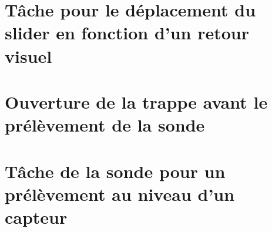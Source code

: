 \documentclass[letterpaper,10pt,english]{sphinxmanual}
\begin{document}
\sphinxstepscope


\chapter{Tâche pour le déplacement du slider en fonction d’un retour visuel}
\label{\detokenize{slider:tache-pour-le-deplacement-du-slider-en-fonction-d-un-retour-visuel}}\label{\detokenize{slider::doc}}


































\sphinxstepscope


\chapter{Ouverture de la trappe avant le prélèvement de la sonde}
\label{\detokenize{trappe:ouverture-de-la-trappe-avant-le-prelevement-de-la-sonde}}\label{\detokenize{trappe::doc}}
\sphinxstepscope


\chapter{Tâche de la sonde pour un prélèvement au niveau d’un capteur}
\label{\detokenize{sonde:tache-de-la-sonde-pour-un-prelevement-au-niveau-d-un-capteur}}\label{\detokenize{sonde::doc}}


\renewcommand{\indexname}{Index}
\printindex
\end{document}
